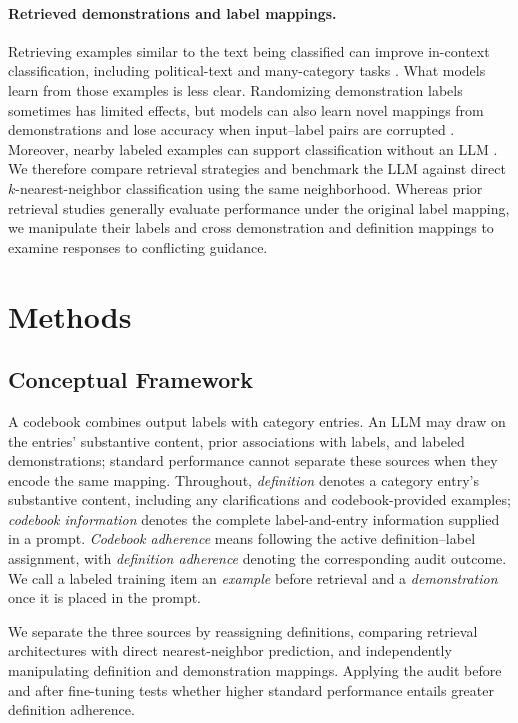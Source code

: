 \documentclass[11pt]{article}
\begin{document}
\paragraph{Retrieved demonstrations and label mappings.}
Retrieving examples similar to the text being classified can improve in-context classification, including political-text and many-category tasks \citep{liu2022,milios2023,liu2024}. What models learn from those examples is less clear. Randomizing demonstration labels sometimes has limited effects, but models can also learn novel mappings from demonstrations and lose accuracy when input--label pairs are corrupted \citep{min2022,wei2023,milios2023}. Moreover, nearby labeled examples can support classification without an LLM \citep{cover1967,milios2023}. We therefore compare retrieval strategies and benchmark the LLM against direct \(k\)-nearest-neighbor classification using the same neighborhood. Whereas prior retrieval studies generally evaluate performance under the original label mapping, we manipulate their labels and cross demonstration and definition mappings to examine responses to conflicting guidance.

\section{Methods}

\subsection{Conceptual Framework}
\label{sec:framework}

A codebook combines output labels with category entries. An LLM may draw on the entries' substantive content, prior associations with labels, and labeled demonstrations; standard performance cannot separate these sources when they encode the same mapping. Throughout, \emph{definition} denotes a category entry's substantive content, including any clarifications and codebook-provided examples; \emph{codebook information} denotes the complete label-and-entry information supplied in a prompt. \emph{Codebook adherence} means following the active definition--label assignment, with \emph{definition adherence} denoting the corresponding audit outcome. We call a labeled training item an \emph{example} before retrieval and a \emph{demonstration} once it is placed in the prompt.

We separate the three sources by reassigning definitions, comparing retrieval architectures with direct nearest-neighbor prediction, and independently manipulating definition and demonstration mappings. Applying the audit before and after fine-tuning tests whether higher standard performance entails greater definition adherence.
\end{document}
